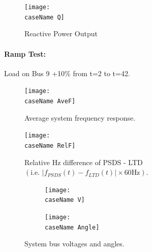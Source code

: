 \documentclass[12pt]{article}
\begin{document}
	\begin{figure}[h!]
			\centering
			\texttt{[image: \\caseName Q]}\vspace{-.5em}
			\caption{Reactive Power Output}
			\label{\caseName Q}		 
	\end{figure}%

\pagebreak
\renewcommand{\caseName}{SixMachineRamp1}
\paragraph{Ramp Test:} Load on Bus 9 +10\% from t=2 to t=42.
	\begin{figure}[h!]
			\centering
			\texttt{[image: \\caseName AveF]}\vspace{-.5em}
			\caption{Average system frequency response.}
			\label{\caseName F}		 
	\end{figure}%


	\begin{figure}[h!]
			\centering
			\texttt{[image: \\caseName RelF]}\vspace{-.5em}
			\caption{Relative Hz difference of PSDS - LTD $\left( \text{i.e. }  \left|f_{PSDS}(t)- f_{LTD}(t)\right| \times 60 \text{Hz} \right)$.}
			\label{\caseName RelF}		 
	\end{figure}%

\begin{figure}[h!]
	\centering
	\begin{subfigure}{.48\linewidth}
		\centering
		\texttt{[image: \\caseName V]}\vspace{-.5em}
		\label{fig:sfig1}
	\end{subfigure}\hspace{1em}%
	\begin{subfigure}{.48\linewidth}
		\centering
		\texttt{[image: \\caseName Angle]}\vspace{-.5em}
		\label{fig:sfig2}
	\end{subfigure}
	\caption{System bus voltages and angles.}
	\label{fig:\caseName V}		 
\end{figure}%
\end{document}
